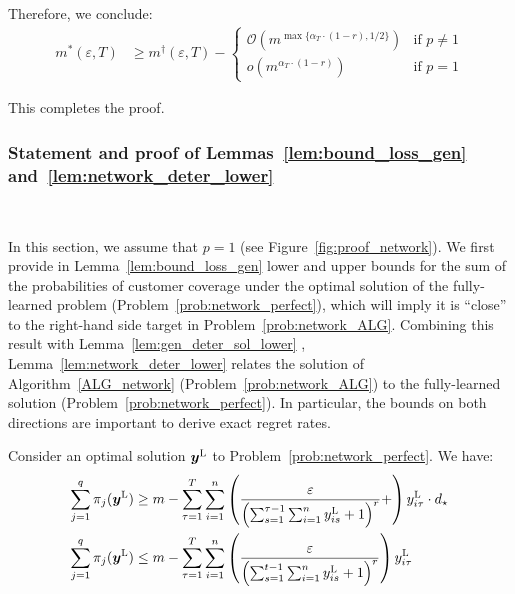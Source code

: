 \documentclass[nonblindrev]{informs3noheader}
\def\calO{\mathcal{O}}
\def\by{\boldsymbol{y}}
\begin{document}
Therefore, we conclude:
\begin{align*}
    m^*(\varepsilon, T)
    &\geq m^\dagger (\varepsilon, T)- \begin{cases}
        \calO\left(m^{\max\{\alpha_T\cdot (1-r),1/2\}}\right) & \text{if }p \neq 1\\
         o\left(m^{\alpha_T\cdot(1-r)}\right) & \text{if }p = 1
    \end{cases} 
\end{align*}

This completes the proof.
\hfill\Halmos

\subsubsection*{Statement and proof of Lemmas~\ref{lem:bound_loss_gen}~ and~\ref{lem:network_deter_lower}}\

In this section, we assume that $p=1$ (see Figure~\ref{fig:proof_network}). We first provide in Lemma~\ref{lem:bound_loss_gen} lower and upper bounds for the sum of the probabilities of customer coverage under the optimal solution of the fully-learned problem (Problem~\eqref{prob:network_perfect}), which will imply it is ``close'' to the right-hand side target in Problem~\eqref{prob:network_ALG}. Combining this result with Lemma~\ref{lem:gen_deter_sol_lower} , Lemma~\ref{lem:network_deter_lower} relates the solution of Algorithm~\ref{ALG_network} (Problem~\eqref{prob:network_ALG}) to the fully-learned solution (Problem~\eqref{prob:network_perfect}). In particular, the bounds on both directions are important to derive exact regret rates.

\begin{lemma}\label{lem:bound_loss_gen}
   Consider an optimal solution $\by^{\textsc{L}}$ to Problem~\eqref{prob:network_perfect}. We have:
   \begin{align*}
   	\sum_{j=1}^q\pi_{j}(\by^{\textsc{L}})&\geq m-\sum_{\tau=1}^T \sum_{i =1}^n \left(\frac{\varepsilon}{\left(\sum_{s=1}^{\tau-1}\sum_{i=1}^n y^{\textsc{L}}_{is}+1\right)^r}+\right)y^{\textsc{L}}_{i\tau}\cdot d_\star\\
	\sum_{j=1}^q\pi_{j}(\by^{\textsc{L}})&\leq m-\sum_{\tau=1}^T\sum_{i=1}^n\left(\frac{\varepsilon}{\left(\sum_{s=1}^{t-1}\sum_{i=1}^n y^{\textsc{L}}_{is}+1\right)^r}\right)y^{\textsc{L}}_{i\tau}
   \end{align*}
\end{lemma}

\end{document}
